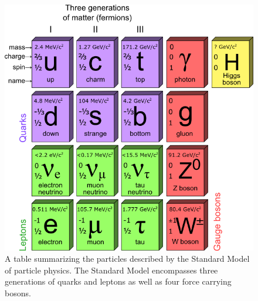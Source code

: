 \begin{figure}[htbp]
    \centering
    \includegraphics[scale=0.4, angle=0]{./figures/StandardModelPNG}
    \caption{A table summarizing the particles described by the
    Standard Model of particle physics. The Standard Model encompasses
    three generations of quarks and leptons as well as four force carrying
    bosons.}
    \label{fig:sm}
\end{figure}

